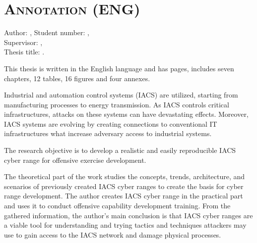 \chapter*{\textsc{Annotation (ENG)}}

Author: \me, Student number: \studentcode, \\
Supervisor: \supervisortitle \supervisor,  \\
Thesis title: \titleName.  

This thesis is written in the English language and has \pageref*{LastPage} pages, includes seven chapters, 12 tables, 16 figures and four annexes.

Industrial and automation control systems (IACS) are utilized, starting from manufacturing processes to energy transmission. As IACS  controls critical infrastructures, attacks on these systems can have devastating effects. Moreover, IACS systems are evolving by creating connections to conventional IT infrastructures what increase adversary access to industrial systems.

The research objective is to develop a realistic and easily reproducible IACS cyber range for offensive exercise development. 

The theoretical part of the work studies the concepts, trends, architecture, and scenarios of previously created IACS cyber ranges to create the basis for cyber range development. The author creates IACS cyber range in the practical part and uses it to conduct offensive capability development training. From the gathered information, the author's main conclusion is that IACS cyber ranges are a viable tool for understanding and trying tactics and techniques attackers may use to gain access to the IACS network and damage physical processes.

